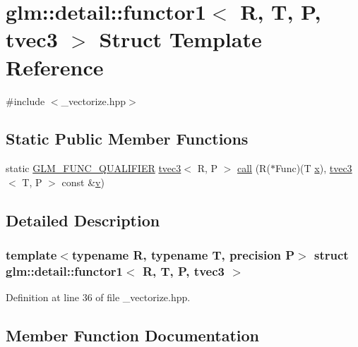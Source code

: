 \hypertarget{structglm_1_1detail_1_1functor1_3_01_r_00_01_t_00_01_p_00_01tvec3_01_4}{}\section{glm\+::detail\+::functor1$<$ R, T, P, tvec3 $>$ Struct Template Reference}
\label{structglm_1_1detail_1_1functor1_3_01_r_00_01_t_00_01_p_00_01tvec3_01_4}


{\ttfamily \#include $<$\+\_\+vectorize.\+hpp$>$}

\subsection*{Static Public Member Functions}
\begin{DoxyCompactItemize}
\item 
static \mbox{\hyperlink{setup_8hpp_a33fdea6f91c5f834105f7415e2a64407}{G\+L\+M\+\_\+\+F\+U\+N\+C\+\_\+\+Q\+U\+A\+L\+I\+F\+I\+ER}} \mbox{\hyperlink{structglm_1_1tvec3}{tvec3}}$<$ R, P $>$ \mbox{\hyperlink{structglm_1_1detail_1_1functor1_3_01_r_00_01_t_00_01_p_00_01tvec3_01_4_a8ae374d9111e3de3d32f18762f1918cc}{call}} (R($\ast$Func)(T \mbox{\hyperlink{glad_8h_a92d0386e5c19fb81ea88c9f99644ab1d}{x}}), \mbox{\hyperlink{structglm_1_1tvec3}{tvec3}}$<$ T, P $>$ const \&\mbox{\hyperlink{glad_8h_a14cfbe2fc2234f5504618905b69d1e06}{v}})
\end{DoxyCompactItemize}


\subsection{Detailed Description}
\subsubsection*{template$<$typename R, typename T, precision P$>$\newline
struct glm\+::detail\+::functor1$<$ R, T, P, tvec3 $>$}



Definition at line 36 of file \+\_\+vectorize.\+hpp.



\subsection{Member Function Documentation}
\mbox{\label{structglm_1_1detail_1_1functor1_3_01_r_00_01_t_00_01_p_00_01tvec3_01_4_a8ae374d9111e3de3d32f18762f1918cc}} 
